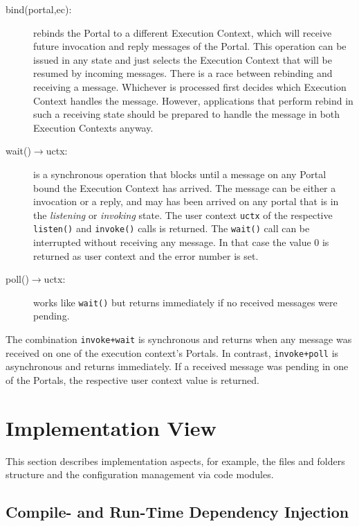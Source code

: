 \begin{description}
\item[bind(portal,ec):] rebinds the Portal to a different Execution Context, which will receive future invocation and reply messages of the Portal. This operation can be issued in any state and just selects the Execution Context that will be resumed by incoming messages. There is a race between rebinding and receiving a message. Whichever is processed first decides which Execution Context handles the message. However, applications that perform rebind in such a receiving state should be prepared to handle the message in both Execution Contexts anyway.   

\item[wait()$\rightarrow$uctx:] is a synchronous operation that blocks until a message on any Portal bound the Execution Context has arrived. The message can be either a invocation or a reply, and may has been arrived on any portal that is in the \emph{listening} or \emph{invoking} state. The user context \texttt{uctx} of the respective \texttt{listen()} and \texttt{invoke()} calls is returned. The \texttt{wait()} call can be interrupted without receiving any message. In that case the value 0 is returned as user context and the error number is set.

\item[poll()$\rightarrow$uctx:] works like \texttt{wait()} but returns immediately if no received messages were pending.
\end{description}

The combination \texttt{invoke+wait} is synchronous and returns when any message was received on one of the execution context's Portals. In contrast, \texttt{invoke+poll} is asynchronous and returns immediately. If a received message was pending in one of the Portals, the respective user context value is returned.


\section{Implementation View}
\label{sec:global-development-view}

This section describes implementation aspects, for example, the files and folders structure and the configuration management via code modules.

\subsection{Compile- and Run-Time Dependency Injection}
\label{sec:dependency-injection-impl}

